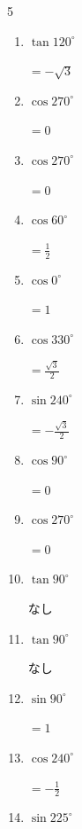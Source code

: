 \begin{multicols}{5}
\begin{enumerate}
  \item $\displaystyle \tan{120^\circ}$

        $\displaystyle =-\sqrt{3}$

  \item $\displaystyle \cos{270^\circ}$

        $\displaystyle =0$

  \item $\displaystyle \cos{270^\circ}$

        $\displaystyle =0$

  \item $\displaystyle \cos{60^\circ}$

        $\displaystyle =\frac{1}{2}$

  \item $\displaystyle \cos{0^\circ}$

        $\displaystyle =1$

  \item $\displaystyle \cos{330^\circ}$

        $\displaystyle =\frac{\sqrt{3}}{2}$

  \item $\displaystyle \sin{240^\circ}$

        $\displaystyle =-\frac{\sqrt{3}}{2}$

  \item $\displaystyle \cos{90^\circ}$

        $\displaystyle =0$

  \item $\displaystyle \cos{270^\circ}$

        $\displaystyle =0$

  \item $\displaystyle \tan{90^\circ}$

        $\displaystyle なし$

  \item $\displaystyle \tan{90^\circ}$

        $\displaystyle なし$

\columnbreak %

  \item $\displaystyle \sin{90^\circ}$

        $\displaystyle =1$

  \item $\displaystyle \cos{240^\circ}$

        $\displaystyle =-\frac{1}{2}$

  \item $\displaystyle \sin{225^\circ}$


\end{enumerate}
\end{multicols}
